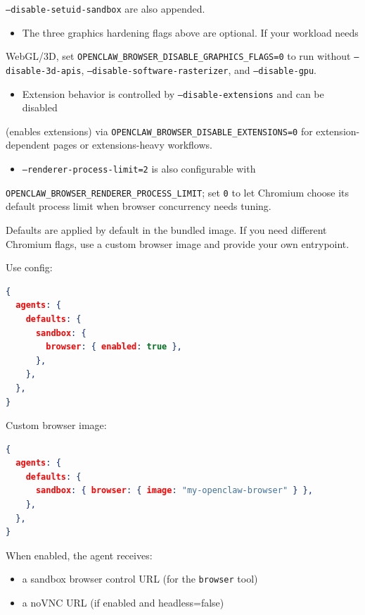\texttt{--disable-setuid-sandbox} are also appended.
\begin{itemize}
  \item The three graphics hardening flags above are optional. If your workload needs
\end{itemize}

WebGL/3D, set \texttt{OPENCLAW\_BROWSER\_DISABLE\_GRAPHICS\_FLAGS=0} to run without
\texttt{--disable-3d-apis}, \texttt{--disable-software-rasterizer}, and \texttt{--disable-gpu}.
\begin{itemize}
  \item Extension behavior is controlled by \texttt{--disable-extensions} and can be disabled
\end{itemize}

(enables extensions) via \texttt{OPENCLAW\_BROWSER\_DISABLE\_EXTENSIONS=0} for
extension-dependent pages or extensions-heavy workflows.
\begin{itemize}
  \item \texttt{--renderer-process-limit=2} is also configurable with
\end{itemize}

\texttt{OPENCLAW\_BROWSER\_RENDERER\_PROCESS\_LIMIT}; set \texttt{0} to let Chromium choose its
default process limit when browser concurrency needs tuning.

Defaults are applied by default in the bundled image. If you need different
Chromium flags, use a custom browser image and provide your own entrypoint.

Use config:

\begin{lstlisting}[language=json]
{
  agents: {
    defaults: {
      sandbox: {
        browser: { enabled: true },
      },
    },
  },
}
\end{lstlisting}


Custom browser image:

\begin{lstlisting}[language=json]
{
  agents: {
    defaults: {
      sandbox: { browser: { image: "my-openclaw-browser" } },
    },
  },
}
\end{lstlisting}


When enabled, the agent receives:

\begin{itemize}
  \item a sandbox browser control URL (for the \texttt{browser} tool)
  \item a noVNC URL (if enabled and headless=false)
\end{itemize}


